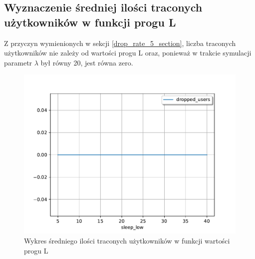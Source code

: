 \subsection{Wyznaczenie średniej ilości traconych użytkowników w funkcji progu L} \label{drop_l_plot}
Z przyczyn wymienionych w sekcji \ref{drop_rate_5_section}, liczba traconych użytkowników nie zależy od wartości progu L oraz, ponieważ w trakcie symulacji parametr $\lambda$ był równy 20, jest równa zero.

\begin{figure}[h!]
\center
\includegraphics[scale=0.65]{img/dropped_users_lambda_20.pdf} 
\caption{Wykres średniego ilości traconych użytkowników w funkcji wartości progu L}
\label{drop_over_time_sleep}
\end{figure}
